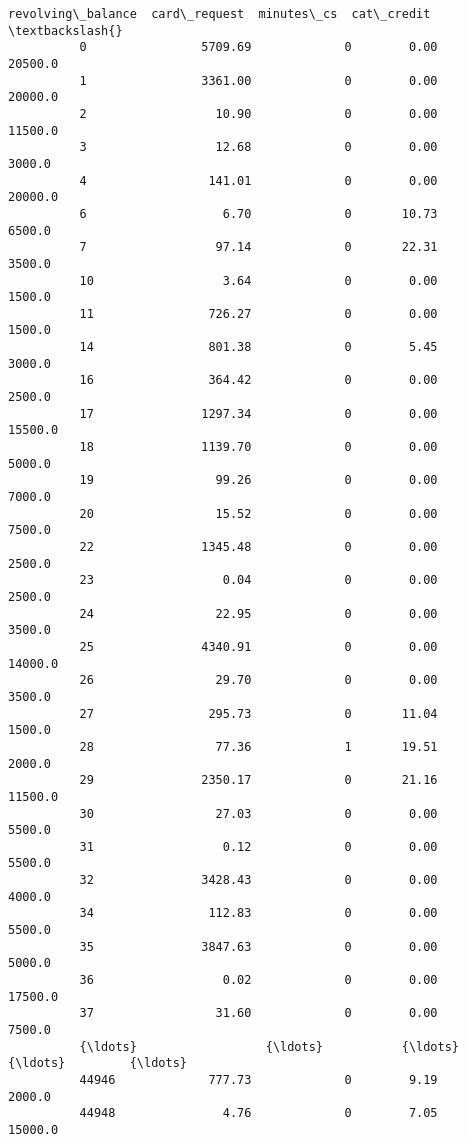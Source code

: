\documentclass[11pt]{article}
\begin{document}
\begin{Verbatim}[commandchars=\\\{\}]
                 revolving\_balance  card\_request  minutes\_cs  cat\_credit  \textbackslash{}
          0                5709.69             0        0.00     20500.0   
          1                3361.00             0        0.00     20000.0   
          2                  10.90             0        0.00     11500.0   
          3                  12.68             0        0.00      3000.0   
          4                 141.01             0        0.00     20000.0   
          6                   6.70             0       10.73      6500.0   
          7                  97.14             0       22.31      3500.0   
          10                  3.64             0        0.00      1500.0   
          11                726.27             0        0.00      1500.0   
          14                801.38             0        5.45      3000.0   
          16                364.42             0        0.00      2500.0   
          17               1297.34             0        0.00     15500.0   
          18               1139.70             0        0.00      5000.0   
          19                 99.26             0        0.00      7000.0   
          20                 15.52             0        0.00      7500.0   
          22               1345.48             0        0.00      2500.0   
          23                  0.04             0        0.00      2500.0   
          24                 22.95             0        0.00      3500.0   
          25               4340.91             0        0.00     14000.0   
          26                 29.70             0        0.00      3500.0   
          27                295.73             0       11.04      1500.0   
          28                 77.36             1       19.51      2000.0   
          29               2350.17             0       21.16     11500.0   
          30                 27.03             0        0.00      5500.0   
          31                  0.12             0        0.00      5500.0   
          32               3428.43             0        0.00      4000.0   
          34                112.83             0        0.00      5500.0   
          35               3847.63             0        0.00      5000.0   
          36                  0.02             0        0.00     17500.0   
          37                 31.60             0        0.00      7500.0   
          {\ldots}                  {\ldots}           {\ldots}         {\ldots}         {\ldots}   
          44946             777.73             0        9.19      2000.0   
          44948               4.76             0        7.05     15000.0   

\end{Verbatim}
\end{document}
